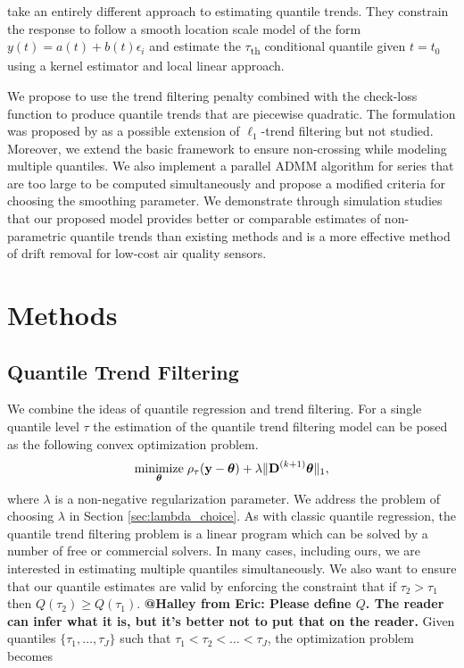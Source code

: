 \documentclass[12pt]{article}
\makeatletter
\newcommand{\Halley}[2]{{\bf {\color{purple}@Halley from #1: #2}}\xspace}
\newcommand{\V}[1]{{\bm{\mathbf{\MakeLowercase{#1}}}}} %
\newcommand{\M}[1]{{\bm{\mathbf{\MakeUppercase{#1}}}}} %
\newcommand{\Mn}[2]{\M{#1}^{(#2)}} %
\makeatother
\begin{document}
	\cite{Racine2017} take an entirely different approach to estimating quantile trends. They constrain the response to follow a smooth location scale model of the form $y(t) = a(t) + b(t)\epsilon_i$ and estimate the $\tau$\textsubscript{th} conditional quantile given $t = t_0$ using a kernel estimator and local linear approach. 

	We propose to use the trend filtering penalty combined with the check-loss function to produce quantile trends that are piecewise quadratic. The formulation was proposed by \cite{Kim2009} as a possible extension of $\ell_1$-trend filtering but not studied. Moreover, we extend the basic framework to ensure non-crossing while modeling multiple quantiles. We also implement a parallel ADMM algorithm for series that are too large to be computed simultaneously and propose a modified criteria for choosing the smoothing parameter. We demonstrate through simulation studies that our proposed model provides better or comparable estimates of non-parametric quantile trends than existing methods and is a more effective method of drift removal for low-cost air quality sensors. 
	

	\section{Methods}
	
	\subsection{Quantile Trend Filtering}
	
	We combine the ideas of quantile regression and trend filtering. For a single quantile level $\tau$ the estimation of the quantile trend filtering model can be posed as the following convex optimization problem.
	\begin{eqnarray}
	\label{eq:quantile_trend}
	\underset{\V{\theta}}{\text{minimize}}\; \rho_\tau(\V{y} - \V{\theta}) + \lambda \lVert \Mn{D}{k+1} \V{\theta} \rVert_1,
	\end{eqnarray}
	where $\lambda$ is a non-negative regularization parameter. We address the problem of choosing $\lambda$ in Section \ref{sec:lambda_choice}. As with classic quantile regression, the quantile trend filtering problem is a linear program which can be solved by a number of free or commercial solvers. In many cases, including ours, we are interested in estimating multiple quantiles simultaneously. We also want to ensure that our quantile estimates are valid by enforcing the constraint that if $\tau_2 > \tau_1$ then $Q(\tau_2) \ge Q(\tau_1)$. \Halley{Eric}{Please define $Q$. The reader can infer what it is, but it's better not to put that on the reader.} Given quantiles $\{\tau_1, \ldots, \tau_J\}$ such that $\tau_1 < \tau_2 < \ldots < \tau_J$, the optimization problem becomes 
	
\end{document}
